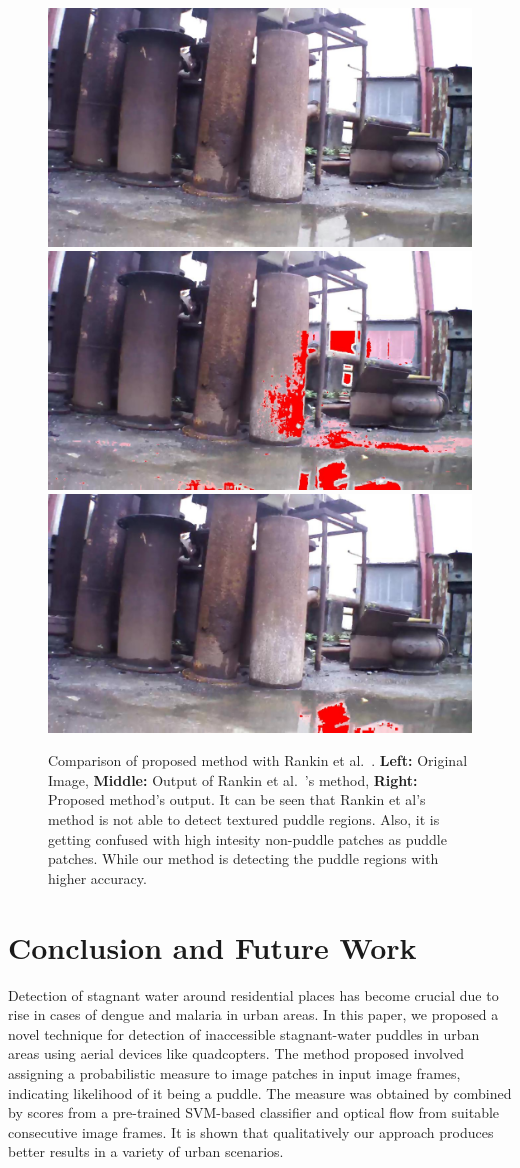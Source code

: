 \documentclass[times,10pt,twocolumn,letterpaper]{article}
\begin{document}
\begin{figure}
\includegraphics[width=0.31\linewidth]{images/results/dataset_83/IMG_PAIR_130_1.jpg}
\includegraphics[width=0.31\linewidth]{images/results/dataset_83/output_130_jpl2.jpg}
\includegraphics[width=0.31\linewidth]{images/results/dataset_83/output_130.jpg}\\
	
\caption{Comparison of proposed method with Rankin et al.~\cite{rankin04}.
\textbf{Left:} Original Image, \textbf{Middle:} Output of Rankin et
al.~\cite{rankin04}'s method, \textbf{Right:} Proposed method's output. It can
be seen that Rankin et al's method is not able to detect textured puddle
regions. Also, it is getting confused with high intesity non-puddle patches as
puddle patches. While our method is detecting the puddle regions with higher accuracy.}
\label{fig:comparison}
\end{figure}
 
\section{Conclusion and Future Work}
Detection of stagnant water around residential places has become crucial
due to rise in cases of dengue and malaria in urban areas. In this paper, we
proposed a novel technique for detection of inaccessible stagnant-water puddles
in urban areas using aerial devices like quadcopters.
The method proposed involved assigning a probabilistic measure to image patches
in input image frames, indicating likelihood of it being a puddle. The measure
was obtained by combined by scores from a pre-trained SVM-based classifier and
optical flow from suitable consecutive image frames. It is shown that
qualitatively our approach produces better results in a variety of urban
scenarios.
\end{document}
